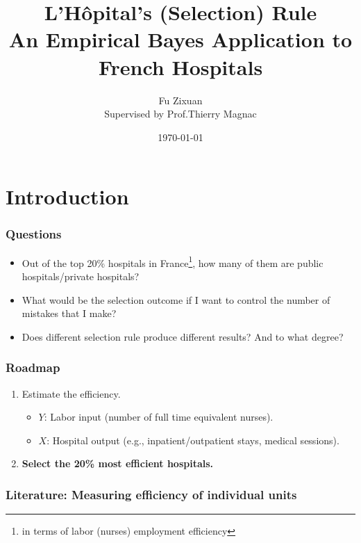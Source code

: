 \documentclass[10pt,mathserif,aspectratio=169]{beamer}
\title{\large \bfseries L'Hôpital's (Selection) Rule\\
  An Empirical Bayes Application to French Hospitals}
\author{Fu Zixuan\\[3ex]
  Supervised by Prof.Thierry Magnac}
\date{\today}
\begin{document}
\frame{
  \thispagestyle{empty}
  \titlepage
}

\section{Introduction}

\begin{frame}
  \frametitle{Questions}
  \begin{itemize}\itemsep=12pt
    \item Out of the top 20\% hospitals in France\footnote{in terms of labor (nurses)
            employment efficiency}, how many of them are public hospitals/private
          hospitals?
    \item What would be the selection outcome if I want to control the number of mistakes
          that I make?
    \item Does different selection rule produce different results? And to what degree?
  \end{itemize}
\end{frame}

\begin{frame}
  \frametitle{Roadmap}
  \begin{enumerate}\itemsep=12pt
    \item Estimate the efficiency.
          \begin{itemize} \itemsep=8pt
            \item $Y$: Labor input (number of full time equivalent nurses).
            \item $X$: Hospital output (e.g., inpatient/outpatient stays, medical sessions).
          \end{itemize}
    \item \textbf{Select the 20\% most efficient hospitals.}

  \end{enumerate}
\end{frame}

\begin{frame}[label=literature]
  \frametitle{Literature: Measuring efficiency of individual units}
\end{frame}
\end{document}
